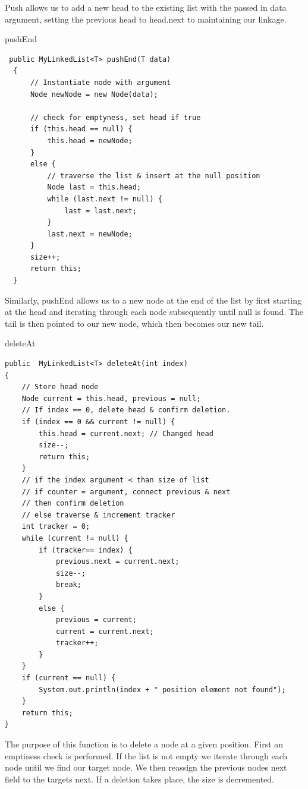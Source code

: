 \documentclass[a4paper]{article}
\begin{document}
Push allows us to add a new head to the existing list 
with the passed in data argument, setting the previous head 
to head.next to maintaining our linkage.

\newpage



\begin{algorithm}
\caption{pushEnd}\label{euclid}

\begin{verbatim}
 public MyLinkedList<T> pushEnd(T data)
  {
      // Instantiate node with argument
      Node newNode = new Node(data);
       
      // check for emptyness, set head if true
      if (this.head == null) {
          this.head = newNode;
      }
      else {
          // traverse the list & insert at the null position
          Node last = this.head;
          while (last.next != null) {
              last = last.next;
          }
          last.next = newNode;
      }
      size++;
      return this;
  }
\end{verbatim}

\end{algorithm}


Similarly, pushEnd allows us to a new node at the end of the list by first starting 
at the head and iterating through each node subsequently until null is found. 
The tail is then pointed to our new node, which then becomes our new tail.
\newpage


\vspace*{0pt}
\begin{algorithm}
\caption{deleteAt}\label{euclid}

\begin{verbatim}
public  MyLinkedList<T> deleteAt(int index)
{
    // Store head node
    Node current = this.head, previous = null;
    // If index == 0, delete head & confirm deletion.
    if (index == 0 && current != null) {
        this.head = current.next; // Changed head
        size--;
        return this;
    }
    // if the index argument < than size of list
    // if counter = argument, connect previous & next
    // then confirm deletion
    // else traverse & increment tracker
    int tracker = 0;
    while (current != null) {
        if (tracker== index) {
            previous.next = current.next;
            size--;
            break;
        }
        else {
            previous = current;
            current = current.next;
            tracker++;
        }
    }
    if (current == null) {
        System.out.println(index + " position element not found");
    }
    return this;
}
\end{verbatim}
\end{algorithm}
The purpose of this function is to delete a node at a given position.
First an emptiness check is performed. If the list is not empty
we iterate through each node until we find our target node. 
We then reassign the previous nodes next field to the targets next.
If a deletion takes place, the size is decremented. \\
\end{document}
